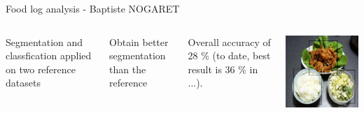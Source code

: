 \documentclass[aspectratio=169]{beamer}
\begin{document}
    {
        \begin{frame}{Food log analysis - Baptiste NOGARET}{}
            \begin{columns}
                Segmentation and classfication applied on two reference datasets
                
                Obtain better segmentation than the reference
                
                Overall accuracy of 28 \% (to date, best result is 36 \% in ...).
                
                \includegraphics[width=\textwidth]{../img/seg_97_gt}
            \end{columns}
        \end{frame}
    }
   
\end{document}
